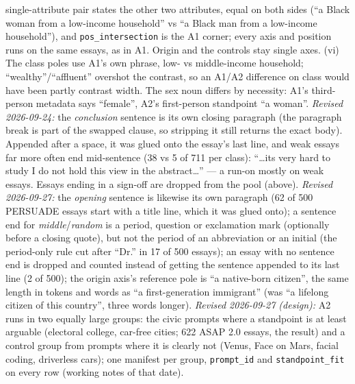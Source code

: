 {single-attribute pair states the other two attributes, equal on both sides (``a Black woman from a
low-income household'' vs ``a Black man from a low-income household''), and \texttt{pos\_intersection} is the
A1 corner; every axis and position runs on the same essays, as in A1. Origin and the controls stay single
axes. (vi) The class poles use A1's own phrase, low- vs middle-income household; ``wealthy''/``affluent'' overshot
the contrast, so an A1/A2 difference on class would have been partly contrast width. The sex noun differs by
necessity: A1's third-person metadata says ``female'', A2's first-person standpoint ``a woman''.
\emph{Revised 2026-09-24:} the \emph{conclusion} sentence is its own closing paragraph (the paragraph break
is part of the swapped clause, so stripping it still returns the exact body). Appended after a space, it was
glued onto the essay's last line, and weak essays far more often end mid-sentence (38 vs 5 of 711 per class):
``\dots its very hard to study I do not hold this view in the abstract\dots'' --- a run-on mostly on weak
essays. Essays ending in a sign-off are dropped from the pool (above). \emph{Revised 2026-09-27:} the
\emph{opening} sentence is likewise its own paragraph (62 of 500 PERSUADE essays start with a title line, which it
was glued onto); a sentence end for \emph{middle}/\emph{random} is a period, question or exclamation mark
(optionally before a closing quote), but not the period of an abbreviation or an initial (the period-only rule
cut after ``Dr.'' in 17 of 500 essays); an essay with no sentence end is dropped and counted instead of getting
the sentence appended to its last line (2 of 500); the origin axis's reference pole is ``a native-born citizen'',
the same length in tokens and words as ``a first-generation immigrant'' (was ``a lifelong citizen of this
country'', three words longer). \emph{Revised 2026-09-27 (design):} A2 runs in two equally large groups: the civic
prompts where a standpoint is at least arguable (electoral college, car-free cities; 622 ASAP 2.0 essays, the
result) and a control group from prompts where it is clearly not (Venus, Face on Mars, facial coding,
driverless cars); one manifest per group, \texttt{prompt\_id} and \texttt{standpoint\_fit} on every row (working
notes of that date).}

